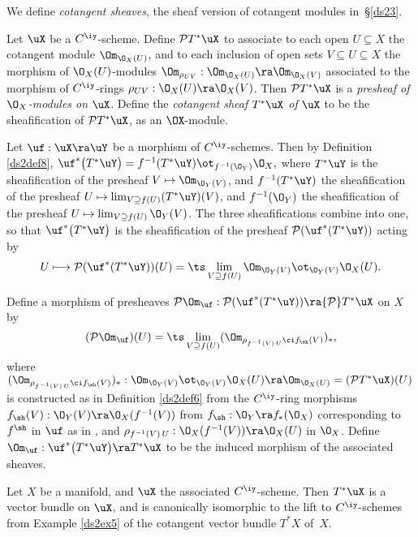 \documentclass{article}
\begin{document}
We define {\it cotangent sheaves}, the sheaf version of cotangent
modules in~\S\ref{ds23}.

\begin{dfn} Let $\uX$ be a $C^\iy$-scheme. Define
${\cal P}T^*\uX$ to associate to each open $U\subseteq X$ the
cotangent module $\Om_{\O_X(U)}$, and to each inclusion of open sets
$V\subseteq U\subseteq X$ the morphism of $\O_X(U)$-modules
$\Om_{\rho_{UV}}:\Om_{\O_X(U)}\ra\Om_{\O_X(V)}$ associated to the
morphism of $C^\iy$-rings $\rho_{UV}:\O_X(U)\ra\O_X(V)$. Then ${\cal
P}T^*\uX$ is a {\it presheaf of\/ $\O_X$-modules on\/} $\uX$. Define
the {\it cotangent sheaf\/ $T^*\uX$ of\/} $\uX$ to be the
sheafification of ${\cal P}T^*\uX$, as an $\OX$-module.

Let $\uf:\uX\ra\uY$ be a morphism of $C^\iy$-schemes. Then by
Definition \ref{ds2def8}, $\uf^*\bigl(T^*\uY\bigr)=f^{-1}(T^*\uY)
\ot_{f^{-1}(\O_Y)}\O_X,$ where $T^*\uY$ is the sheafification of the
presheaf $V\mapsto\Om_{\O_Y(V)}$, and $f^{-1}(T^*\uY)$ the
sheafification of the presheaf $U\mapsto\lim_{V\supseteq f(U)}
(T^*\uY)(V)$, and $f^{-1}(\O_Y)$ the sheafification of the presheaf
$U\mapsto\lim_{V\supseteq f(U)}\O_Y(V)$. The three sheafifications
combine into one, so that $\uf^*\bigl(T^*\uY\bigr)$ is the
sheafification of the presheaf ${\cal P}(\uf^*(T^*\uY))$ acting by
\begin{equation*}
U\longmapsto{\cal P}(\uf^*(T^*\uY))(U)=
\ts\lim_{V\supseteq f(U)}\Om_{\O_Y(V)}\ot_{\O_Y(V)}\O_X(U).
\end{equation*}

Define a morphism of presheaves ${\cal P}\Om_\uf:{\cal
P}(\uf^*(T^*\uY))\ra{\cal P}T^*\uX$ on $X$ by
\begin{equation*}
({\cal P}\Om_\uf)(U)=\ts\lim_{V\supseteq f(U)}
(\Om_{\rho_{f^{-1}(V)\,U}\ci f_\sh(V)})_*,
\end{equation*}
where $(\Om_{\rho_{f^{-1}(V)\,U}\ci f_\sh(V)})_*:\Om_{\O_Y(V)}
\ot_{\O_Y(V)}\O_X(U)\ra\Om_{\O_X(U)}=({\cal P} T^*\uX)(U)$ is
constructed as in Definition \ref{ds2def6} from the $C^\iy$-ring
morphisms $f_\sh(V):\O_Y(V)\ra\O_X(f^{-1}(V))$ from $f_\sh:\O_Y\ra
f_*(\O_X)$ corresponding to $f^\sh$ in $\uf$ as in , and
$\rho_{f^{-1}(V)\,U}:\O_X(f^{-1}(V))\ra\O_X(U)$ in $\O_X$. Define
$\Om_\uf:\uf^*\bigl(T^*\uY\bigr)\ra T^*\uX$ to be the induced
morphism of the associated sheaves.
\label{ds2def9}
\end{dfn}

\begin{ex} Let $X$ be a manifold, and $\uX$ the associated
$C^\iy$-scheme. Then $T^*\uX$ is a vector bundle on $\uX$, and is
canonically isomorphic to the lift to $C^\iy$-schemes from Example
\ref{ds2ex5} of the cotangent vector bundle $T^*X$ of~$X$.
\label{ds2ex6}
\end{ex}
\end{document}
